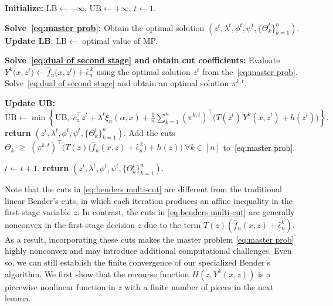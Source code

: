 \documentclass[onefignum,onetabnum]{siamart251216}
\begin{document}
\begin{algorithm}[ht!]
\caption{Specialized Bender's algorithm for solving ER-$\rm{D^3RO}$ \eqref{eq:general two stage problem reformulation}}
\label{algo:erd3ro-benders}
\small
\begin{algorithmic}[1]
\STATE \textbf{Initialize:} $\mathrm{LB}\gets -\infty$, $\mathrm{UB}\gets +\infty$, $t\gets 1$.

    \STATE \textbf{Solve\ \eqref{eq:master prob}:} Obtain the optimal solution $(z^{t},\lambda^{t},\phi^t,\psi^t,\{\Theta_k^{t}\}_{k=1}^n)$.
    \STATE \textbf{Update LB}: $\mathrm{LB}\gets$ optimal value of MP.

    \STATE \textbf{Solve\ \eqref{eq:dual of second stage} and obtain cut coefficients:}
        \STATE Evaluate $Y^k\bigl(x,z^{t}\bigr)\gets \hat f_n\bigl(x,z^{t}\bigr)+\hat\epsilon_n^{\,k}$ using the optimal solution $z^t$ from the\ \eqref{eq:master prob}.
        \STATE Solve\ \eqref{eq:dual of second stage} and obtain an optimal solution $\pi^{k,t}$.

    \ENDFOR

    \STATE \textbf{Update UB:} \\
    $   \mathrm{UB}\gets \min\left\{\mathrm{UB},\;
    c_z^\top z^{t} + \lambda^t \xi_n(\alpha,x)+\frac{1}{n}\sum_{k=1}^n (\pi^{k,t})^\top\bigl(T(z^{t})\,Y^k(x,z^{t})+h(z^{t})\bigr)
    \right\}.$
    \STATE \textbf{return} $(z^{t}, \lambda^{t},\phi^t,\psi^t, \{\Theta_k^{t}\}_{k=1}^n)$.
\ELSE
    \STATE Add the cuts $\Theta_k \;\ge\; (\pi^{k,t})^\top\bigl(T(z)\bigl(\hat f_n(x,z)+\hat\epsilon_n^{\,k}\bigr)+h(z)\bigr)\ \forall k\in[n]$ to\ \eqref{eq:master prob}.
\ENDIF

    \STATE $t\gets t+1$.
\ENDWHILE
\STATE \textbf{return} $(z^{t}, \lambda^{t},\phi^t,\psi^t, \{\Theta_k^{t}\}_{k=1}^n)$.
\end{algorithmic}
\normalsize
\end{algorithm}


Note that the cuts in \eqref{eq:benders multi-cut} are different from the traditional linear Bender's cuts, in which each iteration produces an affine inequality in the first-stage variable $z$. In contrast, the cuts in \eqref{eq:benders multi-cut} are generally nonconvex in the first-stage decision $z$ due to the term $T(z)(\hat{f}_n(x,z) + \hat{\epsilon}_n^k)$. As a result, incorporating these cuts makes the master problem \eqref{eq:master prob} highly nonconvex and may introduce additional computational challenges. Even so, we can still establish the finite convergence of our specialized Bender's algorithm. We first show that the recourse function $H(z,Y^k(x,z))$ is a piecewise nonlinear function in $z$ with a finite number of pieces in the next lemma.
\end{document}

